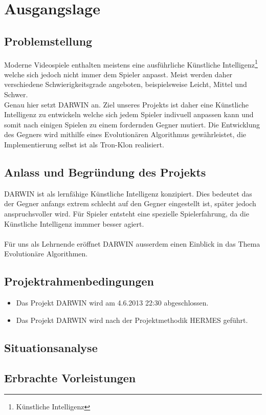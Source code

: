 \section{Ausgangslage}
\subsection{Problemstellung}
Moderne Videospiele enthalten meistens eine ausführliche Künstliche Intelligenz\footnote{Künstliche Intelligenz} welche sich jedoch nicht immer dem Spieler anpasst. Meist werden daher verschiedene Schwierigkeitsgrade angeboten, beispielsweise Leicht, Mittel und Schwer.\\
Genau hier setzt DARWIN an. Ziel unseres Projekts ist daher eine Künstliche Intelligenz zu entwickeln welche sich jedem Spieler indivuell anpassen kann und somit nach einigen Spielen zu einem fordernden Gegner mutiert. Die Entwicklung des Gegners wird mithilfe eines Evolutionären Algorithmus gewährleistet, die Implementierung selbst ist als Tron-Klon realisiert.
\subsection{Anlass und Begründung des Projekts}
DARWIN ist als lernfähige Künstliche Intelligenz konzipiert. Dies bedeutet das der Gegner anfangs extrem schlecht auf den Gegner eingestellt ist, später jedoch anspruchsvoller wird. Für Spieler entsteht eine spezielle Spielerfahrung, da die Künstliche Intelligenz immmer besser agiert. \\\\Für uns als Lehrnende eröffnet DARWIN ausserdem einen Einblick in das Thema Evolutionäre Algorithmen.
\subsection{Projektrahmenbedingungen}
\begin{itemize}
	\item Das Projekt DARWIN wird am 4.6.2013 22:30 abgeschlossen.
	\item Das Projekt DARWIN wird nach der Projektmethodik HERMES geführt.
\end{itemize}
\subsection{Situationsanalyse}
\subsection{Erbrachte Vorleistungen}
